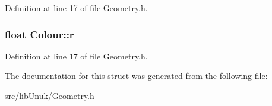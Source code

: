 Definition at line 17 of file Geometry.h.

\hypertarget{struct_colour_acb0b39e6e5e18b946732f51f126c8bf8}{
\subsubsection[{r}]{\setlength{\rightskip}{0pt plus 5cm}float {\bf Colour::r}}}
\label{struct_colour_acb0b39e6e5e18b946732f51f126c8bf8}


Definition at line 17 of file Geometry.h.



The documentation for this struct was generated from the following file:\begin{DoxyCompactItemize}
\item 
src/libUnuk/\hyperlink{_geometry_8h}{Geometry.h}\end{DoxyCompactItemize}
